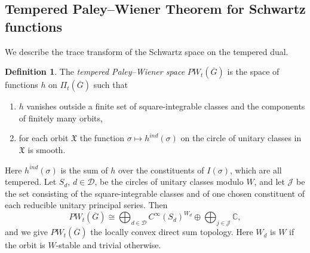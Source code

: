 \documentclass[12pt,letterpaper]{article}
\numberwithin{equation}{section}
\theoremstyle{definition}
\newtheorem{xdefinition}[theorem]{Definition}
\newcommand{\C}{\mathbb C}
\newcommand{\bG}{\overline{G}}
\newcommand{\fX}{\mathfrak X}
\newcommand{\Pit}{\Pi_{t}(\bG)}
\begin{document}
\subsection{Tempered Paley--Wiener Theorem for Schwartz functions}\label{subsec:PWt}

We describe the trace transform of the Schwartz space on the tempered dual.

\begin{xdefinition}\label{def:PWt}
The \emph{tempered Paley--Wiener space} $PW_t(\bG)$ is the space of functions $h$ on $\Pit$
such that
\begin{enumerate}[label=(T\arabic*),leftmargin=*,itemsep=1pt]
\item $h$ vanishes outside a finite set of square-integrable classes and the components of
finitely many orbits,
\item for each orbit $\fX$ the function $\sigma\mapsto h^{ind}(\sigma)$ on the circle of
unitary classes in $\fX$ is smooth.
\end{enumerate}
Here $h^{ind}(\sigma)$ is the sum of $h$ over the constituents of $I(\sigma)$, which are all
tempered.  Let $S_d$, $d\in\mathcal D$, be the circles of unitary classes modulo $W$, and
let $\mathcal J$ be the set consisting of the square-integrable classes and of one chosen
constituent of each reducible unitary principal series.  Then
\[
PW_t(\bG)\cong\bigoplus_{d\in\mathcal D}C^\infty(S_d)^{W_d}\oplus\bigoplus_{j\in\mathcal J}\C ,
\]
and we give $PW_t(\bG)$ the locally convex direct sum topology.  Here $W_d$ is $W$ if the
orbit is $W$-stable and trivial otherwise.
\end{xdefinition}
\end{document}
